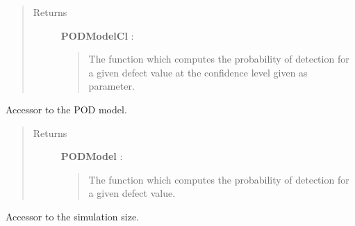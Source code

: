\documentclass[letterpaper,10pt,english]{sphinxmanual}
\begin{document}
\begin{fulllineitems}
\begin{fulllineitems}
\begin{description}
\end{description}
\begin{quote}\begin{description}
\item[{Returns}] \leavevmode
\textbf{PODModelCl} : \href{http://doc.openturns.org/openturns-latest/sphinx/user\_manual/\_generated/openturns.NumericalMathFunction.html\#openturns.NumericalMathFunction}{}
\begin{quote}

The function which computes the probability of detection for a given
defect value at the confidence level given as parameter.
\end{quote}

\end{description}\end{quote}

\end{fulllineitems}


\begin{fulllineitems}
\label{_generated/otpod.UnivariateLinearModelPOD:otpod.UnivariateLinearModelPOD.getPODModel}
Accessor to the POD model.
\begin{quote}\begin{description}
\item[{Returns}] \leavevmode
\textbf{PODModel} : \href{http://doc.openturns.org/openturns-latest/sphinx/user\_manual/\_generated/openturns.NumericalMathFunction.html\#openturns.NumericalMathFunction}{}
\begin{quote}

The function which computes the probability of detection for a given
defect value.
\end{quote}

\end{description}\end{quote}

\end{fulllineitems}


\begin{fulllineitems}
\label{_generated/otpod.UnivariateLinearModelPOD:otpod.UnivariateLinearModelPOD.getSimulationSize}
Accessor to the simulation size.


\end{fulllineitems}
\end{fulllineitems}
\end{document}
